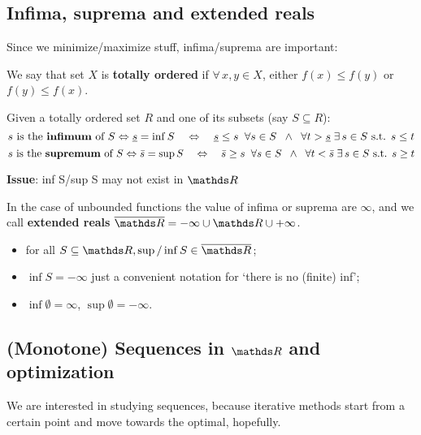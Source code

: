 \documentclass[ComputationalMathematics.tex]{subfiles}
\begin{document}
\subsection{Infima, suprema and extended reals}
\noindent Since we minimize/maximize stuff, infima/suprema are important:
\begin{definition}
  We say that  set $X$ is \textbf{totally ordered} if $\forall \, x, y \in X$, either $f(x) \leq f(y)$ or $f(y) \leq f(x)$.
\end{definition}

\begin{definition}
  Given a totally ordered set $R$ and one of its subsets (say $S \subseteq R$):
\[
  s\text{ is the {\bf infimum} of } S \Leftrightarrow \underline{s} = \inf S
  \quad\Leftrightarrow\quad
  \underline{s} \leq s \;\; \forall s \in S
  \;\;\wedge\;\;
  \forall t > \underline{s} \; \exists \, s \in S \mbox{ s.t. } s \leq t
\]
\[
  s \text{ is the {\bf supremum} of } S \Leftrightarrow \bar{s} = \sup S
  \quad\Leftrightarrow\quad
  \bar{s} \geq s \;\; \forall s \in S
  \;\;\wedge\;\;
  \forall t < \bar{s} \; \exists \, s \in S \mbox{ s.t. } s \geq t
\]
\end{definition}

\noindent \textbf{Issue}: inf S/sup S may not exist in $\R$

\begin{definition}
  In the case of unbounded functions the value of infima or suprema are $\infty$, and we call \textbf{extended reals} $\overline{\R} = {-\infty} \cup \R \cup {+\infty}$.
\end{definition}

\begin{itemize}
    \item for all $S \subseteq \R, \sup / \inf S \in \overline{\R}$;
    \item $\inf S = -\infty $ just a convenient notation for `there is no (finite) inf';
    \item $\inf \emptyset = \infty$, $\sup \emptyset = -\infty$.
\end{itemize}

\subsection{(Monotone) Sequences in $\R$ and optimization}
\noindent We are interested in studying sequences, because iterative methods start from a certain point and move towards the optimal, hopefully.\\
\end{document}
